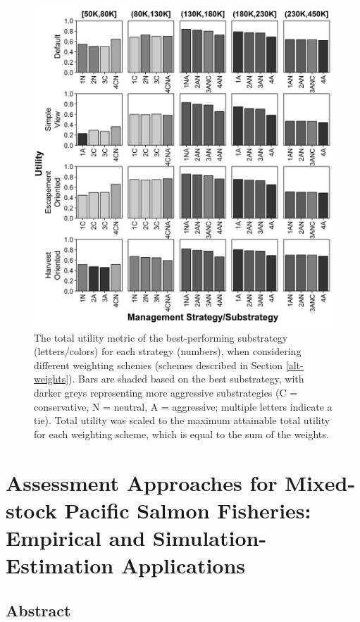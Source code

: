 \documentclass[12pt,]{book}
\theoremstyle{definition}
\theoremstyle{definition}
\theoremstyle{definition}
\theoremstyle{remark}
\begin{document}
\begin{singlespace}
\begin{figure}
  \centering
  \includegraphics{img/Ch3/btwn-ms-weights.jpg}
  \caption{The total utility metric of the best-performing substrategy (letters/colors) for each strategy (numbers), when considering different weighting schemes (schemes described in Section \ref{alt-weights}). Bars are shaded based on the best substrategy, with darker greys representing more aggressive substrategies (C = conservative, N = neutral, A = aggressive; multiple letters indicate a tie). Total utility was scaled to the maximum attainable total utility for each weighting scheme, which is equal to the sum of the weights.}
  \label{fig:btwn-ms-weights}
\end{figure}

\end{singlespace}

\chapter{Assessment Approaches for Mixed-stock Pacific Salmon Fisheries:
Empirical and Simulation-Estimation Applications}\label{ch4}

\section*{Abstract}\label{abstract-2}
\end{document}
